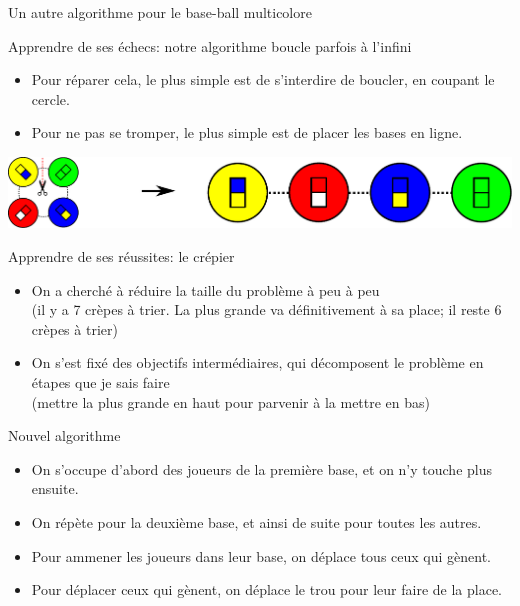 \begin{frame}{Un autre algorithme pour le base-ball multicolore}
  \begin{block}{Apprendre de ses échecs: {\color{black}notre algorithme boucle parfois à l'infini}}
    \begin{itemize}
    \item Pour réparer cela, le plus simple est de s'interdire de boucler, en
      coupant le cercle.
    \item Pour ne pas se tromper, le plus simple est de placer les bases en ligne.
    \end{itemize}

    \begin{center}
      \includegraphics[width=0.8\linewidth]{img/baseball_ligne.pdf}
    \end{center}
  \end{block}

  \bigskip

  \begin{block}{Apprendre de ses réussites: {\color{black}le crépier}}
    \begin{itemize}
    \item On a cherché à réduire la taille du problème à peu à peu\\
      {(il y a 7 crèpes à trier. La plus grande va définitivement à sa place; il
        reste 6 crèpes à trier)}
    \item On s'est fixé des objectifs intermédiaires, qui décomposent le
      problème en étapes que je sais faire\\
      {(mettre la plus grande en haut pour parvenir à la mettre en bas)}
    \end{itemize}
  \end{block}

  \begin{block}{Nouvel algorithme}
    \begin{itemize}
    \item On s'occupe d'abord des joueurs de la première base, et on n'y touche plus ensuite.
    \item On répète pour la deuxième base, et ainsi de suite pour toutes les autres.
    \item Pour ammener les joueurs dans leur base, on déplace tous ceux qui gènent.
    \item Pour déplacer ceux qui gènent, on déplace le trou pour leur faire de la place.
    \end{itemize}
  \end{block}


\end{frame}
